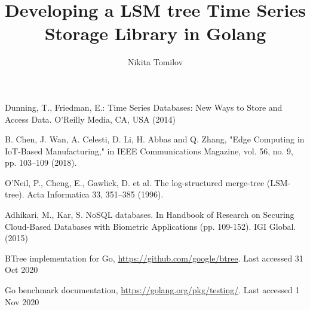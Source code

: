 \documentclass[runningheads]{llncs}
\begin{document}
%
\title{Developing a LSM tree Time Series Storage Library in Golang}
%
%
\author{Nikita Tomilov}
%
%
%
\maketitle              %
%
\begin{abstract}


\end{abstract}
%
%
%




%
%
%
% 
% 
%
\begin{thebibliography}{8}
Dunning, T., Friedman, E.: Time Series Databases: New Ways to Store and Access Data. O'Reilly Media, CA, USA  (2014)

B. Chen, J. Wan, A. Celesti, D. Li, H. Abbas and Q. Zhang, "Edge Computing in IoT-Based Manufacturing," in IEEE Communications Magazine, vol. 56, no. 9, pp. 103--109 (2018). 

O’Neil, P., Cheng, E., Gawlick, D. et al. The log-structured merge-tree (LSM-tree). Acta Informatica 33, 351--385 (1996). 

Adhikari, M., Kar, S. NoSQL databases. In Handbook of Research on Securing Cloud-Based Databases with Biometric Applications (pp. 109-152). IGI Global. (2015)

BTree implementation for Go, \url{https://github.com/google/btree}. Last accessed 31
Oct 2020

Go benchmark documentation, \url{https://golang.org/pkg/testing/}. Last accessed 1
Nov 2020

\end{thebibliography}
\end{document}
